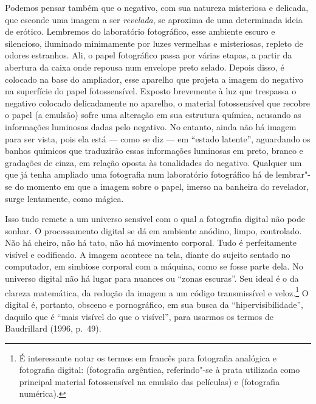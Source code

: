 Podemos pensar também que o negativo, com sua natureza misteriosa e
delicada, que esconde uma imagem a ser \emph{revelada}, se aproxima de
uma determinada ideia de erótico. Lembremos do laboratório fotográfico,
esse ambiente escuro e silencioso, iluminado minimamente por luzes
vermelhas e misteriosas, repleto de odores estranhos. Ali, o papel
fotográfico passa por várias etapas, a partir da abertura da caixa onde
repousa num envelope preto selado. Depois disso, é colocado na base do
ampliador, esse aparelho que projeta a imagem do negativo na superfície
do papel fotossensível. Exposto brevemente à luz que trespassa o
negativo colocado delicadamente no aparelho, o material fotossensível
que recobre o papel (a emulsão) sofre uma alteração em sua estrutura
química, acusando as informações luminosas dadas pelo negativo. No
entanto, ainda não há imagem para ser vista, pois ela está --- como se
diz --- em ``estado latente'', aguardando os banhos químicos que traduzirão
essas informações luminosas em preto, branco e gradações de cinza, em
relação oposta às tonalidades do negativo. Qualquer um que já tenha
ampliado uma fotografia num laboratório fotográfico há de lembrar"-se do
momento em que a imagem sobre o papel, imerso na banheira do revelador,
surge lentamente, como mágica.

Isso tudo remete a um universo sensível com o qual a fotografia digital
não pode sonhar. O processamento digital se dá em ambiente anódino,
limpo, controlado. Não há cheiro, não há tato, não há movimento
corporal. Tudo é perfeitamente visível e codificado. A imagem acontece
na tela, diante do sujeito sentado no computador, em simbiose corporal
com a máquina, como se fosse parte dela. No universo digital não há
lugar para nuances ou ``zonas escuras''. Seu ideal é o da clareza
matemática, da redução da imagem a um código transmissível e
veloz.\footnote{É interessante notar os termos em francês para fotografia
  analógica e fotografia digital: {}
  (fotografia argêntica, referindo"-se à prata utilizada como principal
  material fotossensível na emulsão das películas) e {} (fotografia numérica).} O digital é, portanto, obsceno e
pornográfico, em sua busca da ``hipervisibilidade'', daquilo que é
``mais visível do que o visível'', para usarmos os termos de Baudrillard (1996, p.~49).

